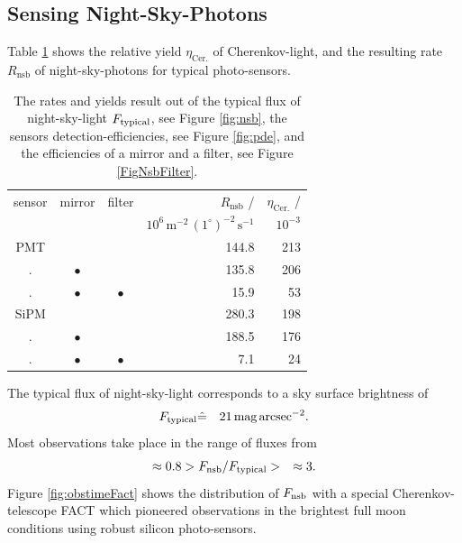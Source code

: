 \documentclass{article}%
\begin{document}
\begin{multicols}{2}
\section*{Sensing Night-Sky-Photons}%
\label{sec:nsb}%
%
Table \ref{TabFilters} shows the relative yield $\eta_\text{Cer.}$ of Cherenkov-light, and the resulting rate $R_\text{nsb}$ of night-sky-photons for typical photo-sensors.
%
\begin{table}[H]
  \begin{center}
    \begin{tabular}{cccrr}
%
        \footnotesize{sensor} &
        \footnotesize{mirror} &
        \footnotesize{filter} &
        $R_\text{nsb}$ /   &
        $\eta_\text{Cer.}$ / \\
%
        &
        &
        &
        \footnotesize{$10^6\,\text{m}^{-2}\,(1^\circ)^{-2}\,\text{s}^{-1}$} &
        \footnotesize{$10^{-3}$} \\
%
        \hline
        PMT &             &             & 144.8 & 213\\
        .   & $\bullet{}$ &             & 135.8 & 206\\
        .   & $\bullet{}$ & $\bullet{}$ &  15.9 &  53\\
        \hline
        SiPM &             &             & 280.3 & 198\\
        .    & $\bullet{}$ &             & 188.5 & 176\\
        .    & $\bullet{}$ & $\bullet{}$ &   7.1 &  24\\
    \end{tabular}
    \caption{
The rates and yields result out of the typical flux of night-sky-light $F_\text{typical}{}$, see Figure \ref{fig:nsb}, the sensors detection-efficiencies, see Figure \ref{fig:pde}, and the efficiencies of a  mirror and a filter, see Figure \ref{FigNsbFilter}.
    }
    \label{TabFilters}
  \end{center}
\end{table}
%
The typical flux of night-sky-light corresponds to a sky surface brightness of
%
\begin{eqnarray*}
F_\text{typical}{} &\hat{=}& 21\,\text{mag}\,\text{arcsec}^{-2}.
\end{eqnarray*}
%
Most observations take place in the range of fluxes from
\begin{eqnarray*}
\approx{}0.8 &> F_\text{nsb}{} / F_\text{typical}{} >& \approx{}3.
\end{eqnarray*}
%
Figure \ref{fig:obstimeFact} shows the distribution of $F_\text{nsb}{}$ with a special Cherenkov-telescope FACT which pioneered observations in the brightest full moon conditions using robust silicon photo-sensors.

\end{multicols}
\end{document}
